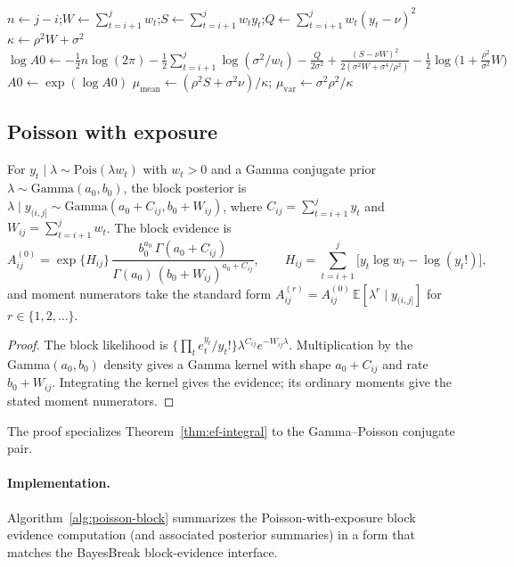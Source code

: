 \begin{algorithm}[H]
\caption{GaussianBlock$(y,w,i,j,\nu,\rho^2,\sigma^2)$}
\label{alg:gaussian-block}
\KwIn{Block indices $(i,j]$; observations $y_{i+1:j}$; weights $w_{i+1:j}$}
$n\leftarrow j-i$;\quad $W\leftarrow \sum_{t=i+1}^j w_t$;\quad $S\leftarrow \sum_{t=i+1}^j w_t y_t$;\quad $Q\leftarrow \sum_{t=i+1}^j w_t (y_t-\nu)^2$\;
$\kappa \leftarrow \rho^2 W+\sigma^2$\;
$\log A0 \leftarrow -\tfrac{1}{2}n\log(2\pi)
-\tfrac{1}{2}\sum_{t=i+1}^j \log(\sigma^2/w_t)
-\tfrac{Q}{2\sigma^2}
+\tfrac{(S-\nu W)^2}{2(\sigma^2 W+\sigma^4/\rho^2)}
-\tfrac{1}{2}\log\big(1+\tfrac{\rho^2}{\sigma^2}W\big)$\;
$A0\leftarrow \exp(\log A0)$\;
$\mu_{\text{mean}}\leftarrow (\rho^2 S+\sigma^2\nu)/\kappa$;\quad
$\mu_{\text{var}}\leftarrow \sigma^2\rho^2/\kappa$\;
\end{algorithm}

\subsection{Poisson with exposure}
\label{sec:family-poisson}

\begin{proposition}
\label{prop:poisson-block}
For $y_t\mid\lambda\sim\mathrm{Pois}(\lambda w_t)$ with $w_t>0$ and a Gamma conjugate prior
$\lambda\sim\mathrm{Gamma}(a_0,b_0)$, the block posterior is
$\lambda\mid y_{(i,j]}\sim\mathrm{Gamma}(a_0+C_{ij},b_0+W_{ij})$, where
$C_{ij}=\sum_{t=i+1}^j y_t$ and $W_{ij}=\sum_{t=i+1}^j w_t$. The block evidence is
\[
A^{(0)}_{ij}
= \exp\{H_{ij}\}\,
\frac{b_0^{a_0}\,\Gamma(a_0+C_{ij})}{\Gamma(a_0)\,(b_0+W_{ij})^{a_0+C_{ij}}},
\qquad H_{ij}=\sum_{t=i+1}^j\big[y_t\log w_t-\log(y_t!)\big],
\]
and moment numerators take the standard form
$A^{(r)}_{ij}=A^{(0)}_{ij}\,\mathbb{E}[\lambda^r\mid y_{(i,j]}]$ for $r\in\{1,2,\dots\}$.
\end{proposition}
\begin{proof}
The block likelihood is $\{\prod_t e_t^{y_t}/y_t!\}\lambda^{C_{ij}}e^{-W_{ij}\lambda}$.
Multiplication by the Gamma$(a_0,b_0)$ density gives a Gamma kernel with shape $a_0+C_{ij}$ and
rate $b_0+W_{ij}$. Integrating the kernel gives the evidence; its ordinary moments give the stated
moment numerators.
\end{proof}

The proof specializes Theorem~\ref{thm:ef-integral} to the Gamma--Poisson conjugate pair.

\paragraph{Implementation.}
Algorithm~\ref{alg:poisson-block} summarizes the Poisson-with-exposure block evidence computation (and associated posterior summaries) in a form that matches the BayesBreak block-evidence interface.

